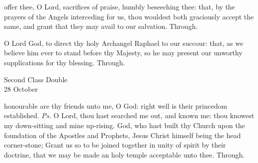 
\secret
{} offer thee, O Lord, sacrifices of praise, humbly beseeching thee: that, by the prayers of the Angels interceding for us, thou wouldest both graciously accept the same, and grant that they may avail to our salvation. Through.


\postcommunion
{} O Lord God, to direct thy holy Archangel Raphael to our succour: that, as we believe him ever to stand before thy Majesty, so he may present our unworthy supplications for thy blessing. Through.


\begin{inhead}
    {Second Class Double\\
28 October}
\end{inhead}
\par\noindent
{}


\introit
{} honourable are thy friends unto me, O God: right well is their princedom established. \textit{Ps.} O Lord, thou hast searched me out, and known me: thou knowest my down-sitting and mine up-rising.
\collect
{} God, who hast built thy Church upon the foundation of the Apostles and Prophets, Jesus Christ himself being the head corner-stone; Grant us so to be joined together in unity of spirit by their doctrine, that we may be made an holy temple acceptable unto thee. Through.

